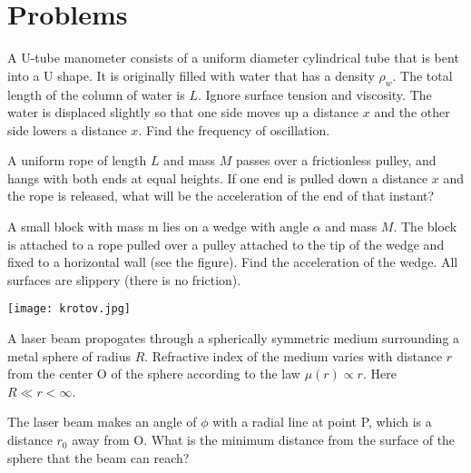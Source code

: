\documentclass[11pt]{scrartcl}
\begin{document}
\section{Problems}
\begin{problem}[2015 $F=ma$]
A U-tube manometer consists of a uniform diameter cylindrical tube that is bent into a U shape. It is originally filled with water that has a density $\rho_w$. The total length of the column of water is $L$. Ignore surface tension and viscosity. The water is displaced slightly so that one side moves up a distance $x$ and the other side lowers a distance $x$. Find the frequency of oscillation.
\end{problem}
\begin{problem}[2019 $F=ma$]
A uniform rope of length $L$ and mass $M$ passes over a frictionless pulley, and hangs with both ends at equal heights. If one end is pulled down a distance $x$ and the rope is released, what will be the acceleration of the end of that instant?
\end{problem}
\begin{problem}
A small block with mass m lies on a wedge with angle $\alpha$ and mass $M$. The block is attached to a rope pulled over a pulley attached to the tip of the wedge and fixed to a horizontal wall (see the figure). Find the acceleration of the wedge. All surfaces are slippery (there is no friction).
\begin{center}
    \texttt{[image: krotov.jpg]}
\end{center}
\end{problem}

\begin{problem}
A laser beam propogates through a spherically symmetric medium surrounding a metal sphere of radius $R$. Refractive index of the medium varies with distance $r$ from the center O of the sphere according to the law $\mu (r) \propto r$. Here $R \ll r < \infty$. 

The laser beam makes an angle of $\phi$ with a radial line at point P, which is a distance $r_0$ away from O. What is the minimum distance from the surface of the sphere that the beam can reach?
\end{problem}
\end{document}
